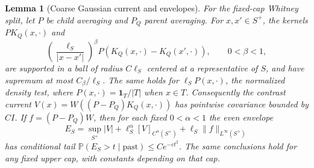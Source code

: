 \documentclass[11pt]{article}
\newtheorem{lemma}{Lemma}
\newcommand{\1}{\mathbf{1}}
\numberwithin{equation}{section}
\begin{document}
\begin{lemma}[Coarse Gaussian current and envelopes]
\label{lem:coarse-envelope}
For the fixed-cap Whitney split, let \(P\) be child averaging
and \(P_Q\) parent averaging. For \(x,x'\in S^+\), the
kernels \(PK_Q(x,\cdot)\) and
\[
 \left(\frac{\ell_S}{|x-x'|}\right)^\beta
           P(K_Q(x,\cdot)-K_Q(x',\cdot)),\qquad 0<\beta<1 ,
\]
are supported in a ball of radius \(C\ell_S\) centered at a
representative of \(S\), and have supremum at most \(C_\beta/\ell_S\).
The same holds for \(\ell_S P(x,\cdot)\), the normalized density
test, where \(P(x,\cdot)=\mathbf1_T/|T|\) when \(x\in T\).
Consequently the contrast current
\(V(x)=W((P-P_Q)K_Q(x,\cdot))\) has pointwise covariance
bounded by \(CI\). If \(f=(P-P_Q)W\), then for each fixed
\(0<\alpha<1\) the even envelope
\[
 E_S=\sup_{S^+}|V|+\ell_S^\alpha[V]_{C^\alpha(S^+)}
                         +\ell_S\|f\|_{L^\infty(S^+)}
\]
has conditional tail \(\mathbb P(E_S>t\mid\mathrm{past})\le C e^{-ct^2}\).
The same conclusions hold for any fixed upper cap, with
constants depending on that cap.
\end{lemma}
\end{document}
